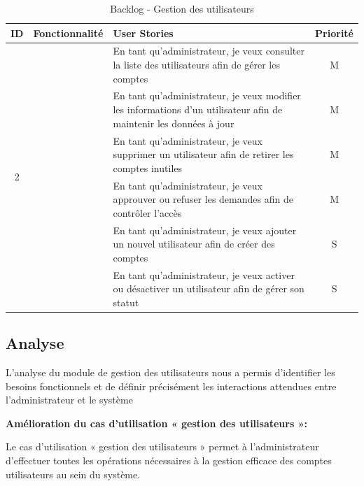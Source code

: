 \begin{table}[H]
\caption{Backlog - Gestion des utilisateurs}
\label{tab:backlog_sprint2}
\centering
\small
\setlength{\tabcolsep}{3pt}
\renewcommand{\arraystretch}{0.85}

\begin{tabular}{|c|>{\centering\arraybackslash}p{2.8cm}|p{9cm}|c|}
\hline
\textbf{ID} & \textbf{Fonctionnalité} & \textbf{User Stories} & \textbf{Priorité} \\
\hline
\multirow{6}{*}{2} & \multirow{6}{=}{\small Gestion des utilisateurs} 
& En tant qu'administrateur, je veux consulter la liste des utilisateurs afin de gérer les comptes & M \\ \cline{3-4}
& & En tant qu'administrateur, je veux modifier les informations d'un utilisateur afin de maintenir les données à jour & M \\ \cline{3-4}
& & En tant qu'administrateur, je veux supprimer un utilisateur afin de retirer les comptes inutiles & M \\ \cline{3-4}
& & En tant qu'administrateur, je veux approuver ou refuser les demandes afin de contrôler l'accès & M \\ \cline{3-4}
& & En tant qu'administrateur, je veux ajouter un nouvel utilisateur afin de créer des comptes & S \\ \cline{3-4}
& & En tant qu'administrateur, je veux activer ou désactiver un utilisateur afin de gérer son statut & S \\
\hline
\end{tabular}

\end{table}

\subsection{Analyse}
L'analyse du module de gestion des utilisateurs nous a permis d'identifier les besoins fonctionnels et de définir précisément les interactions attendues entre l'administrateur et le système
\vspace{0.3cm}

\noindent\textbf{Amélioration du cas d’utilisation « gestion des utilisateurs »:}
 
\noindent Le cas d'utilisation « gestion des utilisateurs » permet à l’administrateur d'effectuer toutes les opérations nécessaires à la gestion efficace des comptes utilisateurs au sein du système.
\vspace{0.3cm}

